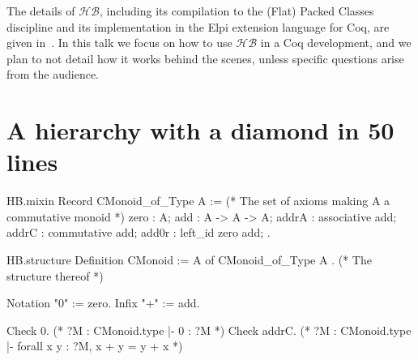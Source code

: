 \documentclass{easychair}
\newcommand{\HB}{\ensuremath{\mathcal{HB}}}
\begin{document}
The details of \HB{}, including its compilation to the (Flat) Packed Classes
discipline and its implementation in the Elpi extension language for Coq,
are given in~\cite{cohen:hal-02478907}.
In this talk we focus on how to use \HB{} in a Coq development, and we plan
to not detail how it works behind the scenes, unless specific questions
arise from the audience.

\section{A hierarchy with a diamond in 50 lines}

\begin{coqcode}
HB.mixin Record CMonoid_of_Type A := { (* The set of axioms making A a commutative monoid *)
  zero : A;
  add : A -> A -> A;
  addrA : associative add;
  addrC : commutative add;
  add0r : left_id zero add;
}.

HB.structure Definition CMonoid := { A of CMonoid_of_Type A }. (* The structure thereof *)

Notation "0" := zero.
Infix "+" := add.

Check 0.     (* ?M : CMonoid.type |- 0 : ?M *)
Check addrC. (* ?M : CMonoid.type |- forall x y : ?M, x + y = y + x *)
\end{coqcode}

\newpage
\end{document}
